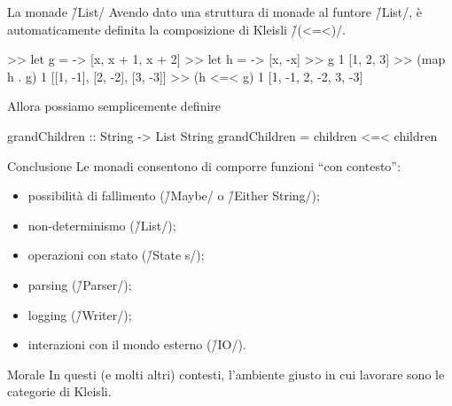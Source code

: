 \begin{frame}[fragile]{\secname}{La monade \h/List/}
Avendo dato una struttura di monade al funtore \h/List/, è automaticamente definita la composizione di Kleisli \h/(<=<)/.
\pause

\begin{runhaskell}
>>  let g = \x -> [x, x + 1, x + 2]
>>  let h = \x -> [x, -x]
>>  g 1
    [1, 2, 3]
>>  (map h . g) 1
    [[1, -1], [2, -2], [3, -3]]
>>  (h <=< g) 1
    [1, -1, 2, -2, 3, -3]
\end{runhaskell}
\pause

Allora possiamo semplicemente definire

\begin{haskellcode}
grandChildren :: String -> List String
grandChildren = children <=< children
\end{haskellcode}
\end{frame}

\begin{frame}[fragile]{\secname}{Conclusione}
Le monadi consentono di comporre funzioni ``con contesto'':
\begin{itemize}[<+(1)->]
\item possibilità di fallimento (\h/Maybe/ o \h/Either String/);
\item non-determinismo (\h/List/);
\item operazioni con stato (\h/State s/);
\item parsing (\h/Parser/);
\item logging (\h/Writer/);
\item interazioni con il mondo esterno (\h/IO/).
\end{itemize}
\pause
\begin{block}{Morale}
In questi (e molti altri) contesti, l'ambiente giusto in cui lavorare sono le categorie di Kleisli.
\end{block}
\end{frame}